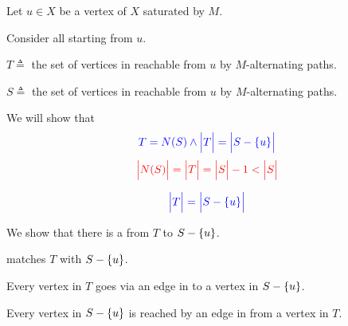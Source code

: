 \begin{frame}{}
  \begin{center}
    Let $u \in X$ be a vertex of $X$  saturated by $M$.


    \pause
    \vspace{0.20cm}
    Consider all  starting from $u$.

    \pause
    \vspace{0.30cm}
    $T \triangleq$ the set of vertices in  reachable from $u$ by $M$-alternating paths.

    \pause
    \vspace{0.20cm}
    $S \triangleq$ the set of vertices in  reachable from $u$ by $M$-alternating paths.

    \pause
    \vspace{0.20cm}
    We will show that
    \[
      \textcolor{blue}{T = N(S) \land \Big\lvert T \Big\rvert = \Big\lvert S - \{u\} \Big\rvert}
    \]
    \pause
    \vspace{-0.30cm}
    \[
      \textcolor{red}{\Big\lvert N(S) \Big\rvert = \Big\lvert T \Big\rvert = \Big\lvert S \Big\rvert - 1 < \Big\lvert S \Big\rvert}
    \]
  \end{center}
\end{frame}

\begin{frame}{}
  \begin{center}
    \[
      \textcolor{blue}{\Big\lvert T \Big\rvert = \Big\lvert S - \{u\} \Big\rvert}
    \]

    \pause
    \vspace{0.30cm}
    We show that there is a  from $T$ to $S - \{u\}$.

    \pause
    \vspace{0.30cm}
     matches $T$ with $S - \{u\}$.

    \pause
    \vspace{0.50cm}
    Every vertex in $T$ goes via an edge in  to a vertex in $S - \{u\}$.

    \pause
    \vspace{0.30cm}
    Every vertex in $S - \{u\}$ is reached by an edge in  from a vertex in $T$.
  \end{center}
\end{frame}

